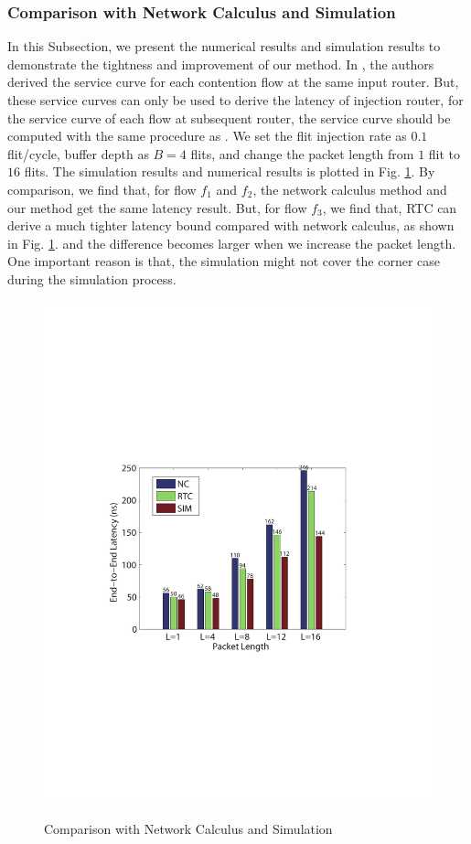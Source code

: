\documentclass[10pt,journal]{IEEEtran}
\begin{document}
\subsubsection{Comparison with Network Calculus and Simulation}
In this Subsection, we present the numerical results and simulation results to demonstrate the tightness and improvement of our method. In \cite{Qian489900}, the authors derived the service curve for each contention flow at the same input router. But, these service curves can only be used to derive the latency of injection router, for the service curve of each flow at subsequent router, the service curve should be computed with the same procedure as \cite{qian2009analysis}. We set the flit injection rate as $0.1$ flit/cycle, buffer depth as $B=4$ flits, and change the packet length from $1$ flit to $16$ flits. The simulation results and numerical results is plotted in Fig. \ref{comparison}. By comparison, we find that, for flow $f_1$ and $f_2$, the network calculus method and our method get the same latency result. But, for flow $f_3$, we find that, RTC can derive a much tighter latency bound compared with network calculus, as shown in Fig. \ref{comparison}. and the difference becomes larger when we increase the packet length. One important reason is that, the simulation might not cover the corner case during the simulation process.
\begin{figure}
  \centering
  \includegraphics[scale=0.6]{figures/comparison.pdf}\\
  \caption{Comparison with Network Calculus and Simulation}\label{comparison}
\end{figure}
\end{document}

